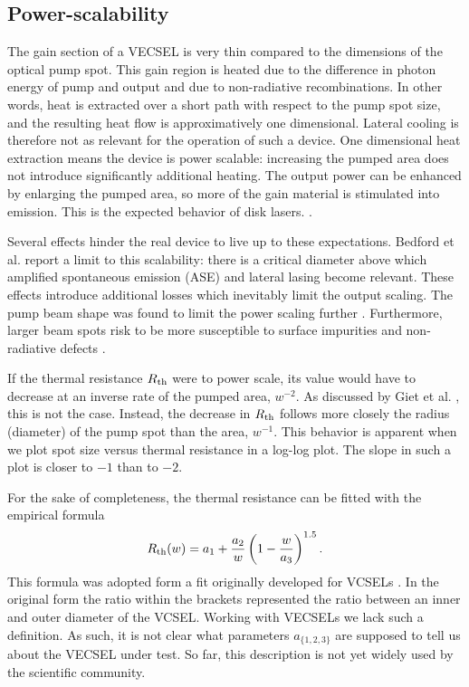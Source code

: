 \subsection{Power-scalability}
\label{sec:rth:scaling}

The gain section of a VECSEL
is very thin compared to
the dimensions of the optical pump spot.
This gain region
is heated
due to the difference in photon energy of pump and output
and due to non-radiative recombinations.
In other words,
heat is extracted
over a short path
with respect to the pump spot size,
and the resulting
heat flow is
approximatively one dimensional.
Lateral cooling is
therefore
not as relevant
for the operation of such a device.
One dimensional heat extraction means
the device is power scalable:
increasing the pumped area
does not introduce
significantly additional heating.
The output power
can be enhanced
by enlarging the pumped area,
so more of the gain material
is stimulated
into emission.
This is the expected behavior
of disk lasers.
\cite{Tropper2006,Lindberg2005,Le1991}.

Several effects
hinder the real device
to live up to these expectations.
Bedford et al. \cite{Bedford2005} report
a limit to this scalability:
there is a critical diameter
above which amplified spontaneous emission (ASE)
and lateral lasing
become relevant.
These effects introduce additional losses
which inevitably limit the output scaling.
The pump beam shape
was found to
limit the power scaling further \cite{Chernikov2010}.
Furthermore,
larger beam spots
risk to be more susceptible
to surface impurities
and non-radiative defects \cite{Korpi2010}.

If the thermal resistance $R_\mathrm{th}$
were to power scale,
its value would have to decrease
at an inverse rate of the pumped area, $w^{-2}$.
As discussed by Giet et al. \cite{Giet2008},
this is not the case.
Instead,
the decrease in $R_\mathrm{th}$ follows more closely
the radius (diameter) of the pump spot
than the area, $w^{-1}$.
This behavior is apparent when we plot
spot size versus thermal resistance
in a log-log plot.
The slope in such a plot
is closer to $-1$ than to $-2$.

For the sake of completeness,
the thermal resistance can be fitted with
the empirical formula \cite{Giet2008}
\begin{equation}
R_\mathrm{th}(w) = a_1+ \frac{a_2}{w} \left( 1-\frac{w}{a_3} \right)^{1.5}.
\label{eq:Rth_empirical}
\end{equation}
This formula was adopted
form a fit originally developed for VCSELs \cite{Nakwaski1992}.
In the original form
the ratio within the brackets
represented the ratio between an inner and outer diameter
of the VCSEL.
Working with VECSELs we lack such a definition.
As such,
it is not clear
what parameters $a_{\{1,2,3\}}$ are supposed
to tell us about the VECSEL under test.
So far,
this description is not yet widely used
by the scientific community.
